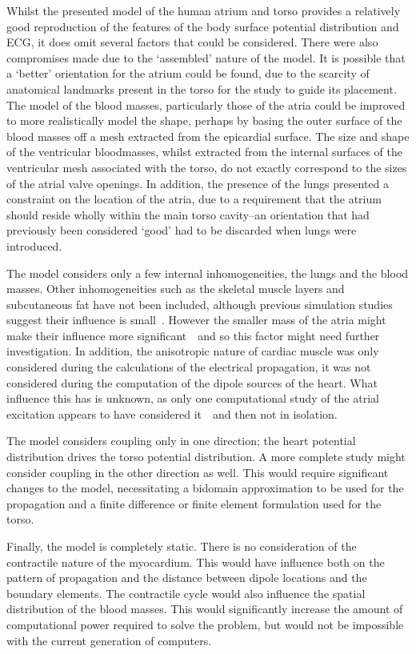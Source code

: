 Whilst the presented model of the human atrium and torso provides a relatively
good reproduction of the features of the body surface potential distribution and
ECG, it does omit several factors that could be considered.
There were also compromises made due to the `assembled' nature of the model.
It is possible that a `better' orientation for the atrium could be found, due to
the scarcity of anatomical landmarks present in the torso for the study to guide
its placement.
The model of the blood masses, particularly those of the atria could be improved
to more realistically model the shape, perhaps by basing the outer surface of
the blood masses off a mesh extracted from the epicardial surface.
The size and shape of the ventricular bloodmasses, whilst extracted from the
internal surfaces of the ventricular mesh associated with the torso, do not
exactly correspond to the sizes of the atrial valve openings.
In addition, the presence of the lungs presented a constraint on the location of
the atria, due to a requirement that the atrium should reside wholly within the
main torso cavity--an orientation that had previously been considered `good' had
to be discarded when lungs were introduced.

The model considers only a few internal inhomogeneities, the lungs and the blood
masses.
Other inhomogeneities such as the skeletal muscle layers and subcutaneous fat
have not been included, although previous simulation studies suggest their
influence is small~\cite{Klepfer1997}.
However the smaller mass of the atria might make their influence more
significant~\cite{vanDam2005}\ and so this factor might need further
investigation.
In addition, the anisotropic nature of cardiac muscle was only considered during
the calculations of the electrical propagation, it was not considered during the
computation of the dipole sources of the heart.
What influence this has is unknown, as only one computational study of the
atrial excitation appears to have considered it~\cite{Seger2004}\ and then not in
isolation.

The model considers coupling only in one direction; the heart potential
distribution drives the torso potential distribution.
A more complete study might consider coupling in the other direction as well.
This would require significant changes to the model, necessitating a bidomain
approximation to be used for the propagation and a finite difference or finite
element formulation used for the torso.

Finally, the model is completely static.
There is no consideration of the contractile nature of the myocardium.
This would have influence both on the pattern of propagation and the distance
between dipole locations and the boundary elements.
The contractile cycle would also influence the spatial distribution of the
blood masses.
This would significantly increase the amount of computational power required to
solve the problem, but would not be impossible with the current generation of
computers.

